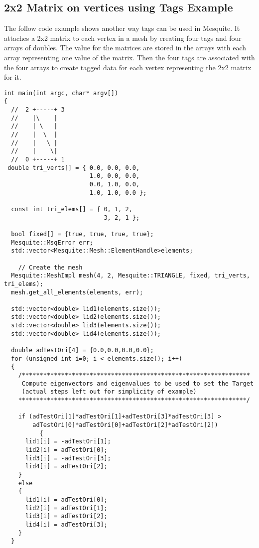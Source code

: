 \subsection{2x2 Matrix on vertices using Tags Example}

The follow code example shows another way tags can be used in Mesquite.  It attaches a 2x2 matrix to each vertex in a mesh by creating four tags and four arrays of doubles. The value for the matrices are stored in the arrays with each array representing one value of the matrix. Then the four tags are associated with the four arrays to create tagged data for each vertex representing the 2x2 matrix for it.


\begin{lstlisting}
int main(int argc, char* argv[])
{
  //  2 +-----+ 3
  //    |\    |
  //    | \   |
  //    |  \  |
  //    |   \ |
  //    |    \|
  //  0 +-----+ 1
 double tri_verts[] = { 0.0, 0.0, 0.0,
                        1.0, 0.0, 0.0,
                        0.0, 1.0, 0.0,
                        1.0, 1.0, 0.0 };

  const int tri_elems[] = { 0, 1, 2,
                            3, 2, 1 };

  bool fixed[] = {true, true, true, true};
  Mesquite::MsqError err;
  std::vector<Mesquite::Mesh::ElementHandle>elements;

    // Create the mesh
  Mesquite::MeshImpl mesh(4, 2, Mesquite::TRIANGLE, fixed, tri_verts, tri_elems);
  mesh.get_all_elements(elements, err);

  std::vector<double> lid1(elements.size());
  std::vector<double> lid2(elements.size());
  std::vector<double> lid3(elements.size());
  std::vector<double> lid4(elements.size());

  double adTestOri[4] = {0.0,0.0,0.0,0.0};
  for (unsigned int i=0; i < elements.size(); i++)
  {
    /****************************************************************
     Compute eigenvectors and eigenvalues to be used to set the Target
     (actual steps left out for simplicity of example)
    ****************************************************************/

    if (adTestOri[1]*adTestOri[1]+adTestOri[3]*adTestOri[3] >
        adTestOri[0]*adTestOri[0]+adTestOri[2]*adTestOri[2])
          {
      lid1[i] = -adTestOri[1];
      lid2[i] = adTestOri[0];
      lid3[i] = -adTestOri[3];
      lid4[i] = adTestOri[2];
    }
    else
    {
      lid1[i] = adTestOri[0];
      lid2[i] = adTestOri[1];
      lid3[i] = adTestOri[2];
      lid4[i] = adTestOri[3];
    }
  }


\end{lstlisting}

